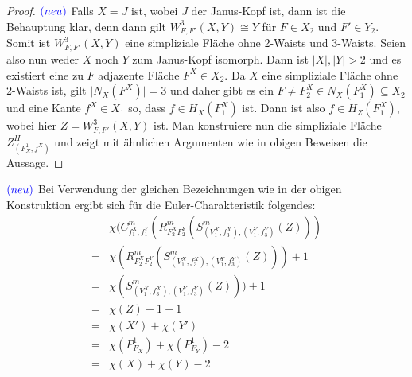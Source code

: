 \documentclass[12pt,titlepage]{article}
\begin{document}
\begin{proof}
$\textcolor{blue}{(neu)}$ 
Falls $X=J$ ist, wobei $J$ der Janus-Kopf ist, dann ist die Behauptung klar, denn dann gilt $W_{F,F'}^3(X,Y) \cong Y$ für $F\in X_2$ und $F' \in Y_2$. Somit ist $W_{F,F'}^3(X,Y)$ eine simpliziale Fläche ohne 2-Waists und 3-Waists.
Seien also nun weder $X$ noch $Y$ zum Janus-Kopf isomorph. Dann ist $\vert X \vert ,\vert Y \vert>2$ und es existiert eine zu $F$ adjazente  Fläche $F^X\in X_2$. Da $X$ eine simpliziale Fläche ohne 2-Waists ist, gilt $\vert N_X(F^X)\vert =3$ und daher gibt es ein $F\neq F_2^X \in N_X(F_1^X)\subseteq X_2$ und eine Kante $f^X \in X_1$  so, dass $f \in H_X(F_1^X)$ ist. Dann ist also $f  \in H_Z(F_1^X)$, wobei hier $Z=W_{F,F'}^3(X,Y)$ ist. Man konstruiere nun die simpliziale Fläche $Z^H_{(F_X^1,f^X)}$ und zeigt mit ähnlichen Argumenten wie in obigen Beweisen die Aussage.
\end{proof} 
$\textcolor{blue}{(neu)}$
Bei Verwendung der gleichen Bezeichnungen wie in der obigen Konstruktion ergibt sich für die Euler-Charakteristik folgendes:
\begin{align*}
&\chi(C^m_{f_1^X,f_1^Y}(R^m_{F_2^X F_2^Y}(S^m_{(V_1^X,f_3^X),(V_1^Y,f_3^Y)}(Z)))\\
=&\chi(R^m_{F_2^X F_2^Y}(S^m_{(V_1^X,f_3^X),(V_1^Y,f_3^Y)}(Z)))+1\\
=&\chi(S^m_{(V_1^X,f_3^X),(V_1^Y,f_3^Y)}(Z)))+1\\
=&\chi(Z)-1+1\\
=&\chi(X')+\chi(Y')\\
=&\chi(P^1_{F_X})+\chi(P^1_{F_Y})-2\\
=&\chi(X)+ \chi(Y)-2
\end{align*}
\end{document}
